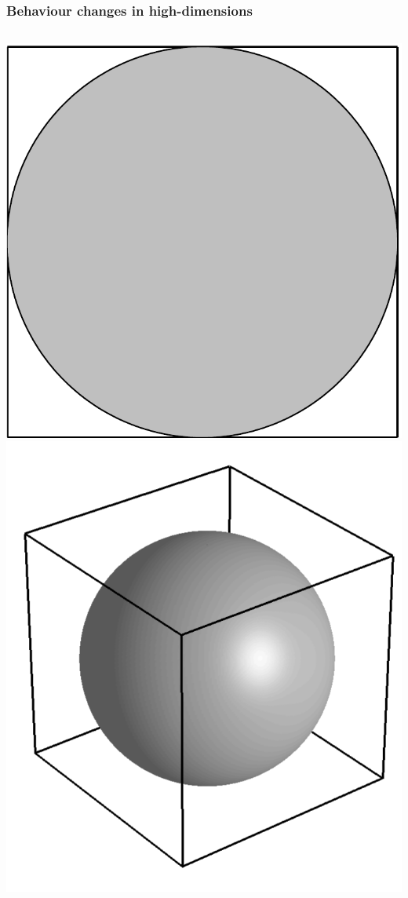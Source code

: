 \begin{frame}
\frametitle{Behaviour changes in high-dimensions}
\begin{columns}[c]
\includegraphics[width=\textwidth]{circle}
\includegraphics[width=\textwidth]{sphere}
\end{columns}
\end{frame}

